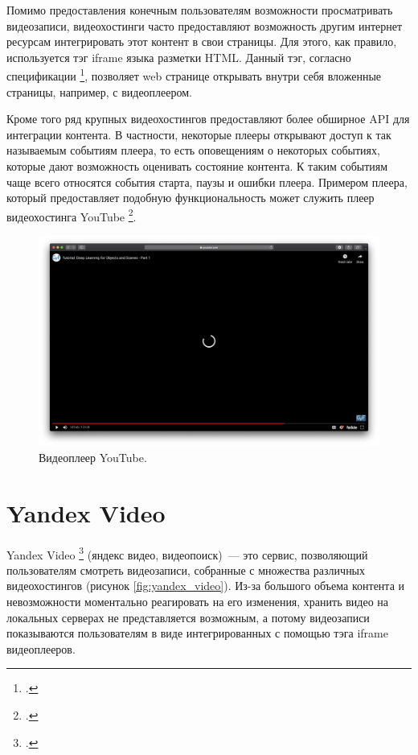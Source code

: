 Помимо предоставления конечным пользователям возможности просматривать видеозаписи, видеохостинги часто предоставляют возможность другим интернет ресурсам интегрировать этот контент в свои страницы. Для этого, как правило, используется тэг iframe языка разметки HTML. Данный тэг, согласно спецификации \footcite{HTML53}, позволяет web странице открывать внутри себя вложенные страницы, например, с видеоплеером.

Кроме того ряд крупных видеохостингов предоставляют более обширное API для интеграции контента. В частности, некоторые плееры открывают доступ к так называемым событиям плеера, то есть оповещениям о некоторых событиях, которые дают возможность оценивать состояние контента. К таким событиям чаще всего относятся события старта, паузы и ошибки плеера. Примером плеера, который предоставляет подобную функциональность может служить плеер видеохостинга YouTube \footcite{YouTubeAPI}.

\begin{figure}
    \centering
    \includegraphics[width=\textwidth]{../images/youtube_good.png}
    \caption{Видеоплеер YouTube.}
    \label{fig:youtube_good}
\end{figure}

\section{Yandex Video}

Yandex Video \footcite{VideoSearch} (яндекс видео, видеопоиск)~--- это сервис, позволяющий пользователям смотреть видеозаписи, собранные с множества различных видеохостингов (рисунок \ref{fig:yandex_video}). Из-за большого объема контента и невозможности моментально реагировать на его изменения, хранить видео на локальных серверах не представляется возможным, а потому видеозаписи показываются пользователям в виде интегрированных с помощью тэга iframe видеоплееров.

